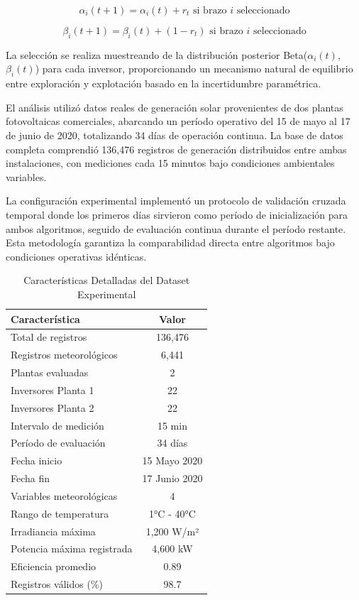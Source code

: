 \documentclass[conference]{IEEEtran}
\begin{document}
\begin{equation}
\alpha_i(t + 1) = \alpha_i(t) + r_t \text{ si brazo } i \text{ seleccionado}
\end{equation}

\begin{equation}
\beta_i(t + 1) = \beta_i(t) + (1-r_t) \text{ si brazo } i \text{ seleccionado}
\end{equation}

La selección se realiza muestreando de la distribución posterior Beta($\alpha_i(t)$, $\beta_i(t)$) para cada inversor, proporcionando un mecanismo natural de equilibrio entre exploración y explotación basado en la incertidumbre paramétrica.

El análisis utilizó datos reales de generación solar provenientes de dos plantas fotovoltaicas comerciales, abarcando un período operativo del 15 de mayo al 17 de junio de 2020, totalizando 34 días de operación continua. La base de datos completa comprendió 136,476 registros de generación distribuidos entre ambas instalaciones, con mediciones cada 15 minutos bajo condiciones ambientales variables.

La configuración experimental implementó un protocolo de validación cruzada temporal donde los primeros días sirvieron como período de inicialización para ambos algoritmos, seguido de evaluación continua durante el período restante. Esta metodología garantiza la comparabilidad directa entre algoritmos bajo condiciones operativas idénticas.

\begin{table}[htb]
\centering
\caption{Características Detalladas del Dataset Experimental}
\label{tab:dataset}
\begin{tabular}{lc}
\toprule
\textbf{Característica} & \textbf{Valor} \\
\midrule
Total de registros & 136,476 \\
Registros meteorológicos & 6,441 \\
Plantas evaluadas & 2 \\
Inversores Planta 1 & 22 \\
Inversores Planta 2 & 22 \\
Intervalo de medición & 15 min \\
Período de evaluación & 34 días \\
Fecha inicio & 15 Mayo 2020 \\
Fecha fin & 17 Junio 2020 \\
Variables meteorológicas & 4 \\
Rango de temperatura & 1°C - 40°C \\
Irradiancia máxima & 1,200 W/m² \\
Potencia máxima registrada & 4,600 kW \\
Eficiencia promedio & 0.89 \\
Registros válidos (\%) & 98.7 \\
\bottomrule
\end{tabular}
\end{table}
\end{document}
